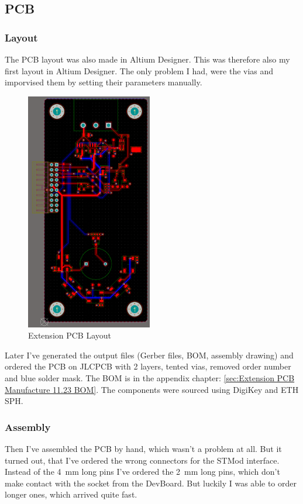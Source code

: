 \newpage
\subsection{PCB}
\subsubsection{Layout}

The PCB layout was also made in Altium Designer. This was therefore also my first layout in Altium Designer. The only problem I had, were the vias and imporvised them by setting their parameters manually. 

\begin{figure}[H]
	\centering
	\includegraphics[width=5.5cm, page=2]{Resources/PCB_LAyout.png}
	\caption{Extension PCB Layout}
	\label{fig:Extension PCB Layout}
\end{figure}

Later I've generated the output files (Gerber files, BOM, assembly drawing) and ordered the PCB on JLCPCB with 2 layers, tented vias, removed order number and blue solder mask. The BOM is in the appendix chapter: \ref{sec:Extension PCB Manufacture 11.23 BOM}. The components were sourced using DigiKey and ETH SPH.

\subsubsection{Assembly}

Then I've assembled the PCB by hand, which wasn't a problem at all. But it turned out, that I've ordered the wrong connectors for the STMod interface. Instead of the 4 mm long pins I've ordered the 2 mm long pins, which don't make contact with the socket from the DevBoard. But luckily I was able to order longer ones, which arrived quite fast.

